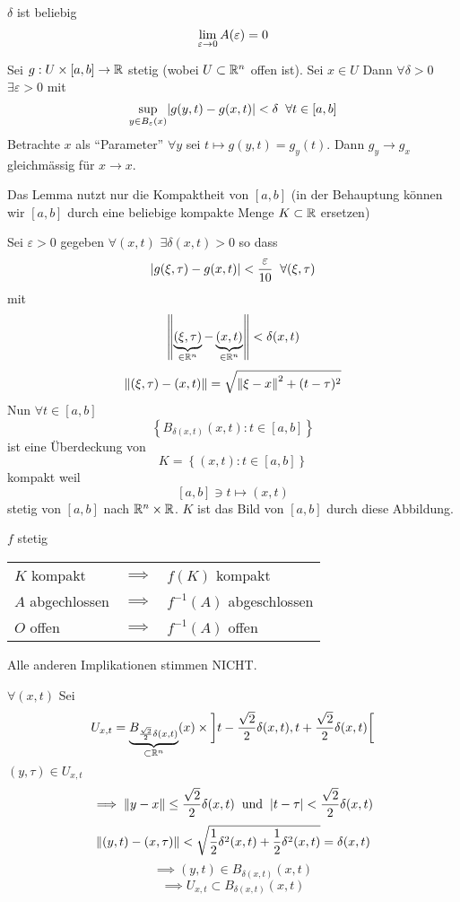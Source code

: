 \begin{Bew}
  $\delta$ ist beliebig
  \[\displaystyle\lim_{\varepsilon\rightarrow0}A(\varepsilon)=0\]
  \begin{Lem}
    Sei $g:U\times [a,b]\rightarrow\mathbb{R}$ stetig (wobei $U\subset\mathbb{R}^n$ offen ist). Sei $x\in U$ Dann $\forall \delta >0$ $\exists \varepsilon>0$ mit
    \[\sup_{y\in B_\varepsilon(x)}\mathopen| g(y,t)-g(x,t) \mathclose|<\delta\hspace{2mm}\forall t\in [a,b]\]
    Betrachte $x$ als ``Parameter'' $\forall y$ sei $t\mapsto g(y,t)=g_y(t)$. Dann $g_y\to g_x$ gleichmässig für $x\to x$.
  \end{Lem}
  \begin{Bem}
    Das Lemma nutzt nur die Kompaktheit von $[a,b]$ (in der Behauptung können wir $[a,b]$ durch eine beliebige kompakte Menge $K\subset\mathbb{R}$ ersetzen)
  \end{Bem}
  \begin{Bew}
    Sei $\varepsilon>0$ gegeben $\forall (x,t)$ $\exists \delta(x,t)>0$ so dass
    \[\mathopen| g(\xi, \tau)-g(x,t) \mathclose|<\frac{\varepsilon}{10}\hspace{2mm}\forall (\xi, \tau)\]
    mit
    \[\left\| \underbrace{(\xi,\tau)}_{\in \mathbb{R}^n}-\underbrace{(x,t)}_{\in \mathbb{R}^n} \right\|<\delta(x,t)\]
    \[\left\| (\xi,\tau)-(x,t) \right\|=\sqrt{\left\| \xi-x \right\|^2+(t-\tau)^2}\]
    Nun $\forall t\in [a,b]$
    \[\left\{ B_{\delta(x,t)}(x,t):t\in [a,b] \right\}\]
    ist eine Überdeckung von
    \[K = \left\{ (x,t):t\in [a,b] \right\}\]
    kompakt weil
    \[\left[ a,b \right]\ni t\mapsto(x,t)\]
    stetig von $[a,b]$ nach $\mathbb{R}^n\times\mathbb{R}$. $K$ ist das Bild von $[a,b]$ durch diese Abbildung.
  \end{Bew}
  \begin{Bem}
    $f$ stetig
    \begin{tabular}{lcl}
      $K$ kompakt & $\implies$ & $f(K)$ kompakt\\
      $A$ abgechlossen & $\implies$ & $f^{-1}(A)$ abgeschlossen\\
      $O$ offen & $\implies$ & $f^{-1}(A)$ offen
    \end{tabular}
    Alle anderen Implikationen stimmen NICHT.
  \end{Bem}
  $\forall (x,t)$ Sei
  \[U_{x,t}=\underbrace{B_{\frac{\sqrt{2}}{2}\delta(x,t)}}_{\subset\mathbb{R}^n}(x)\times \left] t-\frac{\sqrt{2}}{2}\delta(x,t),t+\frac{\sqrt{2}}{2}\delta(x,t) \right[\]
  $(y,\tau)\in U_{x,t}$
  \[\implies \left\| y-x \right\|\leq\frac{\sqrt{2}}{2}\delta(x,t)\hspace{2mm}\text{und}\hspace{2mm}\mathopen| t-\tau \mathclose|<\frac{\sqrt{2}}{2}\delta(x,t)\]
  \[\left\| (y,t)-(x,\tau) \right\|<\sqrt{\frac{1}{2}\delta^2(x,t)+\frac{1}{2}\delta^2(x,t)}=\delta(x,t)\]
  \[\implies (y,t)\in B_{\delta(x,t)}(x,t)\]
  \[\implies U_{x,t}\subset B_{\delta(x,t)}(x,t)\]

\end{Bew}
